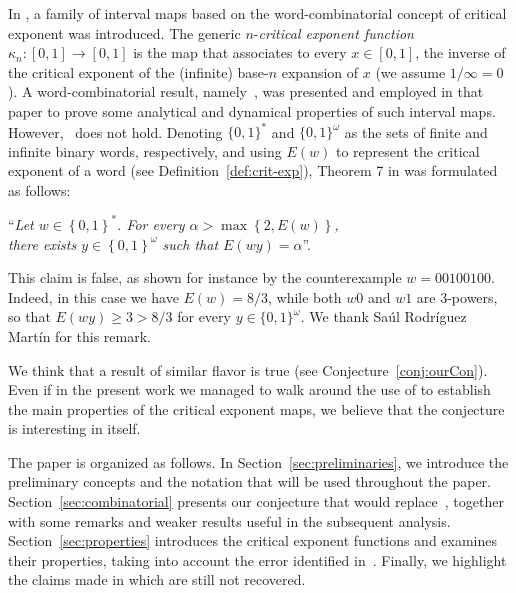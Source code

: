 \documentclass[12pt]{article}
\theoremstyle{plain}\newtheorem{teo}{Theorem}
\theoremstyle{plain}\newtheorem{proposition}[teo]{Proposition}
\theoremstyle{plain}\newtheorem{lemma}[teo]{Lemma}
\theoremstyle{plain}\newtheorem{corollary}[teo]{Corollary}
\theoremstyle{plain}\newtheorem{conjecture}[teo]{Conjecture}
\theoremstyle{definition}\newtheorem{definition}[teo]{Definition}
\theoremstyle{remark}\newtheorem{remark}[teo]{Remark}
\theoremstyle{definition}\newtheorem{example}[teo]{Example}
\numberwithin{teo}{section}
\numberwithin{equation}{section}
\begin{document}
In \cite{Critical}, a family of interval maps based
on the word-combinatorial concept of critical exponent was introduced. 
The generic $n$-\textit{critical exponent function}
$\kappa_n:[0,1]\to[0,1]$ is the map that associates to every $x\in [0,1]$, the inverse of the critical exponent of the (infinite) base-$n$ expansion of $x$
(we assume $1/\infty=0$).  A word-combinatorial result,
namely~\cite[Theorem 7]{Critical}, was presented
and employed in that paper to prove
some analytical and dynamical properties of 
such interval maps.
However,~\cite[Theorem 7]{Critical} does not hold.
Denoting $\{0,1\}^*$ and $\{0,1\}^\omega$ as the sets of
finite and infinite binary words, respectively,
and using $E(w)$ to represent the critical exponent of a word
(see Definition~\ref{def:crit-exp}),
Theorem 7 in \cite{Critical} was formulated as follows:
\begin{center}
``\textit{Let $w \in \left\{0,1\right\}^*$.
For every $\alpha > \max\left\{2,E(w)\right\}$,\\
there exists $y \in \left\{0,1\right\}^\omega$ such that
$E(wy) = \alpha$}''.
\end{center}
This claim is false, as shown for instance by the counterexample $w=00100100$.
Indeed, in this case we have $E(w)=8/3$,
while both $w0$ and $w1$ are 3-powers,
so that $E(wy)\ge 3 > 8/3$ for every $y\in\{0,1\}^\omega$.
We thank Sa\'ul Rodr\'iguez Mart\'in for 
this remark. 

We think that 
a result of similar flavor
is true
(see Conjecture~\ref{conj:ourCon}). Even if in the present work we managed to walk around the use of \cite[Theorem 7]{Critical} to establish the main properties of the critical exponent maps, we believe that the conjecture is interesting in itself. 

The paper is organized as follows. In Section~\ref{sec:preliminaries}, we introduce
the preliminary concepts and the notation that will be used throughout 
the paper.
Section~\ref{sec:combinatorial} presents
our conjecture that would replace~\cite[Theorem 7]{Critical},
together with some remarks and weaker results 
useful in the subsequent analysis.
Section~\ref{sec:properties} introduces the critical exponent functions
and examines their properties,
taking into account the error identified in~\cite[Theorem 7]{Critical}.
Finally, we highlight the claims made in \cite{Critical} which are still not
recovered.
\end{document}
